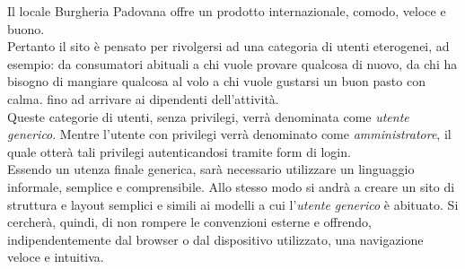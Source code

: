 Il locale Burgheria Padovana offre un prodotto internazionale, comodo, veloce e buono.\\
Pertanto il sito è pensato per rivolgersi ad una categoria di utenti eterogenei, ad esempio: da consumatori abituali a chi vuole provare qualcosa di nuovo, da chi ha bisogno di mangiare qualcosa al volo a chi vuole gustarsi un buon pasto con calma. 
fino ad arrivare ai dipendenti dell'attività.\\
Queste categorie di utenti, senza privilegi, verrà denominata come \emph{utente generico}.
Mentre l'utente con privilegi verrà denominato come \emph{amministratore}, il quale otterà tali privilegi autenticandosi tramite form di login.\\
Essendo un utenza finale generica, sarà necessario utilizzare un linguaggio informale, semplice e comprensibile.
Allo stesso modo si andrà a creare un sito di struttura e layout semplici e simili ai modelli a cui l'\emph{utente generico} è abituato. Si cercherà, quindi, di non rompere le convenzioni esterne e offrendo, indipendentemente dal browser o dal dispositivo utilizzato, una navigazione veloce e intuitiva.\\